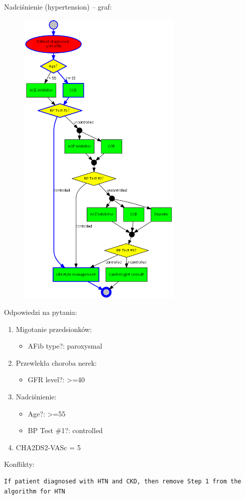 \documentclass[oneside,a4paper]{book}
\begin{document}
\begin{spacing}{1.5}
\begin{figure}[H]
\end{figure}
\newpage
Nadciśnienie (hypertension) – graf:
\begin{figure}[H]
\centering
\includegraphics[width=0.7\textwidth]{img/htn-ver-3.png}
\end{figure}
\newpage
\noindent Odpowiedzi na pytania:
\begin{enumerate}
\item{Migotanie przedsionków:
	\begin{itemize}
	\item{AFib type?: paroxysmal}
	\end{itemize}
}
\item{Przewlekła choroba nerek:
	\begin{itemize}
	\item{GFR level?: >=40}
	\end{itemize}
}
\item{Nadciśnienie:
	\begin{itemize}
	\item{Age?: >=55}
	\item{BP Test \#1?: controlled}
	\end{itemize}
}
\item{CHA2DS2-VASc = 5}
\end{enumerate}
Konflikty:
\begin{verbatim}
If patient diagnosed with HTN and CKD, then remove Step 1 from the algorithm for HTN


\end{verbatim}
\end{spacing}
\end{document}
